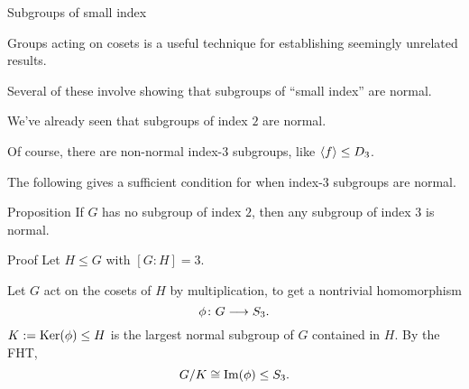 \documentclass[8pt, handout]{beamer}
\newcommand{\Pause}{\pause}      %
\begin{document}
\begin{frame}{Subgroups of small index}

  Groups acting on cosets is a useful technique for establishing
  seemingly unrelated results. \medskip\Pause

  Several of these involve showing that subgroups of ``small index''
  are normal. \medskip\Pause

  We've already seen that subgroups of index $2$ are normal. \medskip\Pause

  Of course, there are non-normal index-$3$ subgroups, like $\langle f\rangle\leq
  D_3$. \medskip\Pause

  The following gives a sufficient condition for when index-$3$
  subgroups are normal.
  
  \smallskip\Pause
  
  \begin{block}{Proposition}
    If $G$ has no subgroup of index $2$, then any subgroup of index
    $3$ is normal.
  \end{block}
  
  \begin{exampleblock}{Proof} \Pause
    Let $H\leq G$ with $[G:H]=3$. \medskip\Pause
    
    Let $G$ act on the cosets of $H$ by multiplication, to get a
    nontrivial homomorphism
    \[
    \phi\colon G\longrightarrow S_3.
    \]
    \Pause $K:=\operatorname{Ker}(\phi)\leq H$ is the largest normal
    subgroup of $G$ contained in $H$. \Pause By the FHT,
    \[
    G/K\cong\operatorname{Im}(\phi)\leq S_3. 
    \]
  \end{exampleblock}
  
\end{frame}

\end{document}
